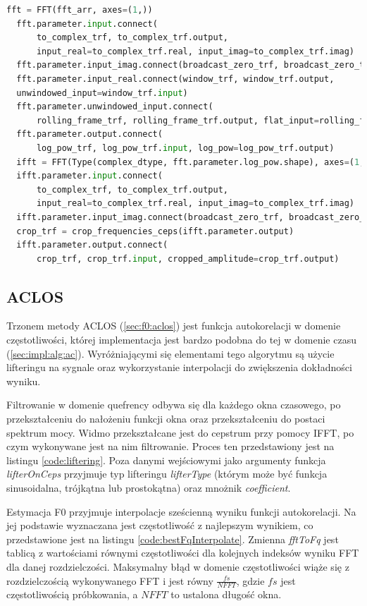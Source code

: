 \documentclass[12pt,a4paper,twoside]{mwart}
\begin{document}
\begin{lstlisting}[float, language=Python, caption={Proces wyliczania cepstrum przy użyciu GPU}, captionpos=b, label={code:cepsF0Gpu}]
  fft = FFT(fft_arr, axes=(1,))
  fft.parameter.input.connect(
      to_complex_trf, to_complex_trf.output,
      input_real=to_complex_trf.real, input_imag=to_complex_trf.imag)
  fft.parameter.input_imag.connect(broadcast_zero_trf, broadcast_zero_trf.output)
  fft.parameter.input_real.connect(window_trf, window_trf.output,
  unwindowed_input=window_trf.input)
  fft.parameter.unwindowed_input.connect(
      rolling_frame_trf, rolling_frame_trf.output, flat_input=rolling_frame_trf.input)
  fft.parameter.output.connect(
      log_pow_trf, log_pow_trf.input, log_pow=log_pow_trf.output)
  ifft = FFT(Type(complex_dtype, fft.parameter.log_pow.shape), axes=(1,))
  ifft.parameter.input.connect(
      to_complex_trf, to_complex_trf.output,
      input_real=to_complex_trf.real, input_imag=to_complex_trf.imag)
  ifft.parameter.input_imag.connect(broadcast_zero_trf, broadcast_zero_trf.output)
  crop_trf = crop_frequencies_ceps(ifft.parameter.output)
  ifft.parameter.output.connect(
      crop_trf, crop_trf.input, cropped_amplitude=crop_trf.output)
\end{lstlisting}

\subsection{ACLOS}\label{sec:impl:alg:aclos}
Trzonem metody ACLOS (\ref{sec:f0:aclos}) jest funkcja autokorelacji w domenie częstotliwości, której implementacja jest bardzo podobna do tej w domenie czasu (\ref{sec:impl:alg:ac}). Wyróżniającymi się elementami tego algorytmu są użycie lifteringu na sygnale oraz wykorzystanie interpolacji do zwiększenia dokładności wyniku.   

Filtrowanie w domenie quefrency odbywa się dla każdego okna czasowego, po przekształceniu do nałożeniu funkcji okna oraz przekształceniu do postaci spektrum mocy. Widmo przekształcane jest do cepstrum przy pomocy IFFT, po czym wykonywane jest na nim filtrowanie. Proces ten przedstawiony jest na listingu \ref{code:liftering}. Poza danymi wejściowymi jako argumenty funkcja \textit{lifterOnCeps} przyjmuje typ lifteringu \textit{lifterType} (którym może być funkcja sinusoidalna, trójkątna lub prostokątna) oraz mnożnik \textit{coefficient}.

Estymacja F0 przyjmuje interpolacje sześcienną wyniku funkcji autokorelacji. Na jej podstawie wyznaczana jest częstotliwość z najlepszym wynikiem, co przedstawione jest na listingu \ref{code:bestFqInterpolate}. Zmienna \textit{fftToFq} jest tablicą z wartościami równymi częstotliwości dla kolejnych indeksów wyniku FFT dla danej rozdzielczości. Maksymalny błąd w domenie częstotliwości wiąże się z rozdzielczością wykonywanego FFT i jest równy $\frac{fs}{NFFT}$, gdzie $fs$ jest częstotliwością próbkowania, a $NFFT$ to ustalona długość okna. 
\end{document}
